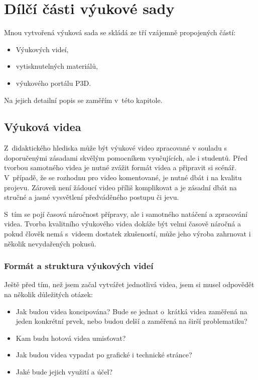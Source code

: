 \chapter{Dílčí části výukové sady}
Mnou vytvořená výuková sada se skládá ze tří vzájemně propojených částí:
\begin{itemize}[topsep=0pt]
    \setlength\itemsep{0em}
    \item Výukových videí,
    \item vytisknutelných materiálů,
    \item výukového portálu P3D.
\end{itemize}
Na jejich detailní popis se zaměřím v~této kapitole.

\section{Výuková videa}
Z~didaktického hlediska může být výukové video zpracované v souladu s doporučenými zásadami skvělým pomocníkem vyučujících, ale i studentů.
Před tvorbou samotného videa je nutné zvážit formát videa a připravit si scénář.
V~případě, že se rozhodnu pro video komentované, je nutné dbát i na kvalitu projevu.
Zároveň není žádoucí video příliš komplikovat a je zásadní dbát na stručné a jasné vysvětlení předváděného postupu či jevu.

S~tím se pojí časová náročnost přípravy, ale i samotného natáčení a zpracování videa.
Tvorba kvalitního výukového videa dokáže být velmi časově náročná a pokud člověk nemá s~videem dostatek zkušeností, může jeho výroba zahrnovat i několik nevydařených pokusů.

\subsection{Formát a struktura výukových videí}
Ještě před tím, než jsem začal vytvářet jednotlivá videa, jsem si musel odpovědět na několik důležitých otázek:
\begin{itemize}[topsep=0pt]
    \setlength\itemsep{0em}
    \item Jak budou videa koncipována? Bude se jednat o~krátká videa zaměřená na jeden konkrétní prvek, nebo budou delší a zaměřená na širší problematiku?
    \item Kam budu hotová videa umisťovat?
    \item Jak budou videa vypadat po grafické i technické stránce?
    \item Jaké bude jejich využití a účel?
\end{itemize}

